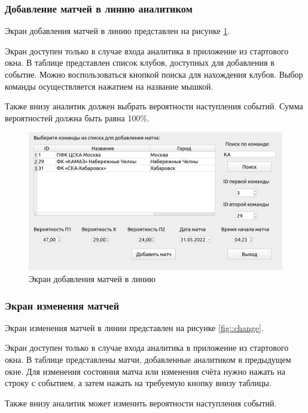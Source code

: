 \subsubsection{Добавление матчей в линию аналитиком}
Экран добавления матчей в линию представлен на рисунке \ref{fig::add}.

Экран доступен только в случае входа аналитика в приложение из стартового окна.
В таблице представлен список клубов, доступных для добавления в событие.
Можно воспользоваться кнопкой поиска для нахождения клубов.
Выбор команды осуществляется нажатием на название мышкой.

Также внизу аналитик должен выбрать вероятности наступления событий. 
Сумма вероятностей должна быть равна 100\%.

\FloatBarrier
\begin{figure}[h]	
	\begin{center}
		\includegraphics[width=\linewidth]{inc/addMatch.png}
	\end{center}
	\captionsetup{justification=centering, labelsep=defffis}
	\caption{Экран добавления матчей в линию}
	\label{fig::add}
\end{figure}
\FloatBarrier

\subsubsection{Экран изменения матчей}
Экран изменения матчей в линии представлен на рисунке \ref{fig::change}.

Экран доступен только в случае входа аналитика в приложение из стартового окна.
В таблице представлены матчи, добавленные аналитиком в предыдущем окне.
Для изменения состояния матча или изменения счёта нужно нажать на строку с событием, а затем нажать на требуемую кнопку внизу таблицы.

Также внизу аналитик может изменить вероятности наступления событий.


